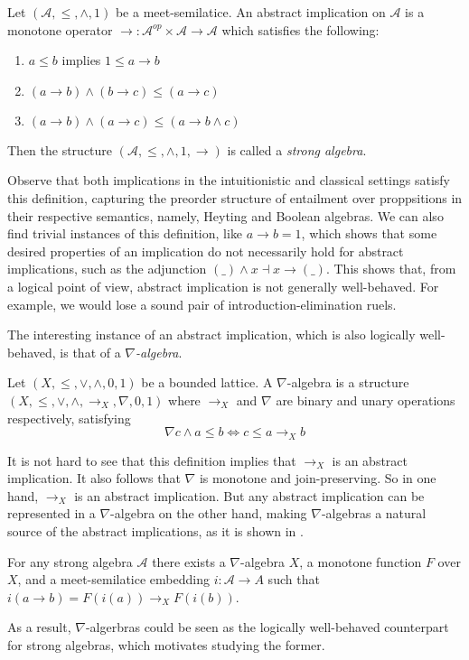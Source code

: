 \documentclass[a4paper, 12pt]{amsart}
\begin{document}
\begin{dfn}
Let $(\mathcal{A}, \le, \wedge, 1)$ be a meet-semilatice. An abstract implication on $\mathcal{A}$ is a monotone operator $\rightarrow : \mathcal{A}^{op} \times \mathcal{A} \rightarrow \mathcal{A}$ which satisfies the following:
\begin{enumerate}
  \item $a \le b$ implies $1 \le a \rightarrow b$
  \item $(a \rightarrow b) \wedge (b \rightarrow c) \le (a \rightarrow c)$
  \item $(a \rightarrow b) \wedge (a \rightarrow c) \le (a \rightarrow b \wedge c)$
\end{enumerate}
Then the structure $(\mathcal{A}, \le, \wedge, 1, \rightarrow)$ is called a \emph{strong algebra}.
\end{dfn}
Observe that both implications in the intuitionistic and classical settings satisfy this definition, capturing the preorder structure of entailment over proppsitions in their respective semantics, namely, Heyting and Boolean algebras. We can also find trivial instances of this definition, like $a \rightarrow b = 1$, which shows that some desired properties of an implication do not necessarily hold for abstract implications, such as the adjunction $(\_) \wedge x \dashv x \rightarrow (\_)$. This shows that, from a logical point of view, abstract implication is not generally well-behaved. For example, we would lose a sound pair of introduction-elimination ruels.

The interesting instance of an abstract implication, which is also logically well-behaved, is that of a \emph{$\nabla$-algebra}.
\begin{dfn} Let $(X, \le, \vee, \wedge, 0, 1)$ be a bounded lattice. A $\nabla$-algebra is a structure $(X, \le, \vee, \wedge, \rightarrow_X, \nabla, 0, 1)$ where $\rightarrow_X$ and $\nabla$ are binary and unary operations respectively, satisfying
\[ \nabla c \wedge a \le b \iff c \le a \rightarrow_X b \]
\end{dfn}
It is not hard to see that this definition implies that $\rightarrow_X$ is an abstract implication. It also follows that $\nabla$ is monotone and join-preserving.
So in one hand, $\rightarrow_X$ is an abstract implication. But any abstract implication can be represented in a $\nabla$-algebra on the other hand, making $\nabla$-algebras a natural source of the abstract implications, as it is shown in \cite{amir}.

\begin{thm}
For any strong algebra $\mathcal{A}$ there exists a $\nabla$-algebra $X$, a monotone function $F$ over $X$, and a meet-semilatice embedding $i : \mathcal{A} \rightarrow A$ such that $i(a \rightarrow b) = F(i(a)) \rightarrow_X F(i(b))$.
\end{thm}
As a result, $\nabla$-algerbras could be seen as the logically well-behaved counterpart for strong algebras, which motivates studying the former.\\
\end{document}
